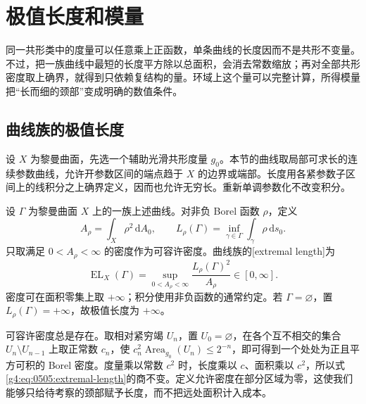 
% 
% 
% 

\section{极值长度和模量}
\label{g4:sec:0505}

同一共形类中的度量可以任意乘上正函数，单条曲线的长度因而不是共形不变量。不过，把一族曲线中最短的长度平方除以总面积，会消去常数缩放；再对全部共形密度取上确界，就得到只依赖复结构的量。环域上这个量可以完整计算，所得模量把“长而细的颈部”变成明确的数值条件。

\subsection{曲线族的极值长度}
\label{g4:subsec:0505:01}

设 \(X\) 为黎曼曲面，先选一个辅助光滑共形度量 \(g_0\)。本节的曲线取局部可求长的连续参数曲线，允许开参数区间的端点趋于 \(X\) 的边界或端部。长度用各紧参数子区间上的线积分之上确界定义，因而也允许无穷长。重新单调参数化不改变积分。

\begin{definition}
	\label{g4:def:0505:extremal-length}
	设 \(\Gamma\) 为黎曼曲面 \(X\) 上的一族上述曲线。对非负 Borel 函数 \(\rho\)，定义
	\[
		A_\rho=\int_X\rho^2\,\mathrm{d}A_0,
		\qquad L_\rho(\Gamma)=\inf_{\gamma\in\Gamma}\int_\gamma\rho\,\mathrm{d}s_0.
	\]
	只取满足 \(0<A_\rho<\infty\) 的密度作为可容许密度。曲线族的[extremal length]为
	\begin{equation}
		\label{g4:eq:0505:extremal-length}
		\operatorname{EL}_X(\Gamma)
		=\sup_{0<A_\rho<\infty}\frac{L_\rho(\Gamma)^2}{A_\rho}
		\in[0,\infty].
	\end{equation}
	密度可在面积零集上取 \(+\infty\)；积分使用非负函数的通常约定。若 \(\Gamma=\varnothing\)，置 \(L_\rho(\Gamma)=+\infty\)，故极值长度为 \(+\infty\)。
\end{definition}

可容许密度总是存在。取相对紧穷竭 \(U_n\)，置 \(U_0=\varnothing\)，在各个互不相交的集合 \(U_n\setminus U_{n-1}\) 上取正常数 \(c_n\)，使 \(c_n^2\operatorname{Area}_{g_0}(U_n)\le2^{-n}\)，即可得到一个处处为正且平方可积的 Borel 密度。度量乘以常数 \(c^2\) 时，长度乘以 \(c\)、面积乘以 \(c^2\)，所以式\eqref{g4:eq:0505:extremal-length}的商不变。定义允许密度在部分区域为零，这使我们能够只给待考察的颈部赋予长度，而不把远处面积计入成本。

